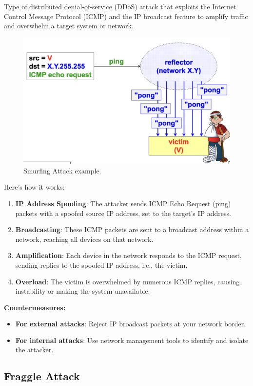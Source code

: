 \begin{multicols}{2}
    Type of distributed denial-of-service (DDoS) attack that exploits the Internet Control Message Protocol (ICMP) and the IP broadcast feature to amplify traffic and overwhelm a target system or network. 

\columnbreak

    \begin{figure}[H]
        \centering
        \includegraphics[width=0.5\linewidth]{Images/NetSec/smurfing.png}
        \caption{Smurfing Attack example.}
    \end{figure}
\end{multicols}

Here’s how it works:
\begin{enumerate}
\item \textbf{IP Address Spoofing}: The attacker sends ICMP Echo Request (ping) packets with a spoofed source IP address, set to the target’s IP address.
\item \textbf{Broadcasting}: These ICMP packets are sent to a broadcast address within a network, reaching all devices on that network.
\item \textbf{Amplification}: Each device in the network responds to the ICMP request, sending replies to the spoofed IP address, i.e., the victim.
\item \textbf{Overload}: The victim is overwhelmed by numerous ICMP replies, causing instability or making the system unavailable.
\end{enumerate}

\textbf{Countermeasures:}
\begin{itemize}
\item \textbf{For external attacks}: Reject IP broadcast packets at your network border.
\item \textbf{For internal attacks}: Use network management tools to identify and isolate the attacker.
\end{itemize}

\begin{center}
    \section{Fraggle Attack}
\end{center}

